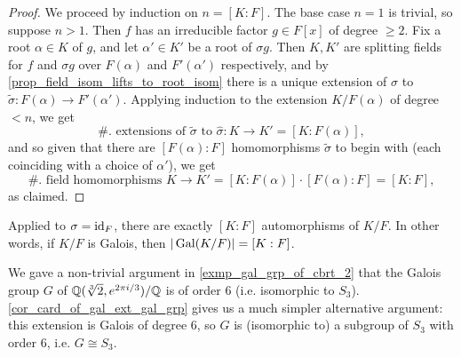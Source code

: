 \begin{proof}
    We proceed by induction on $n = [K : F]$. The base case $n = 1$ is trivial, so suppose $n > 1$. Then $f$ has an irreducible factor $g \in F[x]$ of degree $\geq 2$. Fix a root $\alpha \in K$ of $g$, and let $\alpha' \in K'$ be a root of $\sigma g$. Then $K, K'$ are splitting fields for $f$ and $\sigma g$ over $F(\alpha)$ and $F'(\alpha')$ respectively, and by \cref{prop_field_isom_lifts_to_root_isom} there is a unique extension of $\sigma$ to $\widetilde{\sigma}: F(\alpha) \to F'(\alpha')$. Applying induction to the extension $K/F(\alpha)$ of degree $< n$, we get
    \[
        \#. \text{ extensions of } \widetilde{\sigma} \text{ to } \hat{\sigma}: K \to K' = [K : F(\alpha)],
    \]
    and so given that there are $[F(\alpha) : F]$ homomorphisms $\widetilde{\sigma}$ to begin with (each coinciding with a choice of $\alpha'$), we get
    \[
        \#. \text{ field homomorphisms } K \to K' = [K : F(\alpha)] \cdot [F(\alpha) : F] = [K : F],
    \]
    as claimed.
\end{proof}

\begin{corollary}
\label{cor_card_of_gal_ext_gal_grp}
    Applied to $\sigma = \operatorname{id}_{F}$, there are exactly $[K : F]$ automorphisms of $K/F$. In other words, if $K/F$ is Galois, then $|\operatorname{Gal}(K/F)| = [K : F]$.
\end{corollary}

\begin{example}
    We gave a non-trivial argument in \cref{exmp_gal_grp_of_cbrt_2} that the Galois group $G$ of $\mathbb{{Q}}(\sqrt[3]{2}, e^{2\pi i/3})/\mathbb{{Q}}$ is of order 6 (i.e. isomorphic to $S_3$). \cref{cor_card_of_gal_ext_gal_grp} gives us a much simpler alternative argument: this extension is Galois of degree 6, so $G$ is (isomorphic to) a subgroup of $S_3$ with order 6, i.e. $G \cong S_3$.
\end{example}
